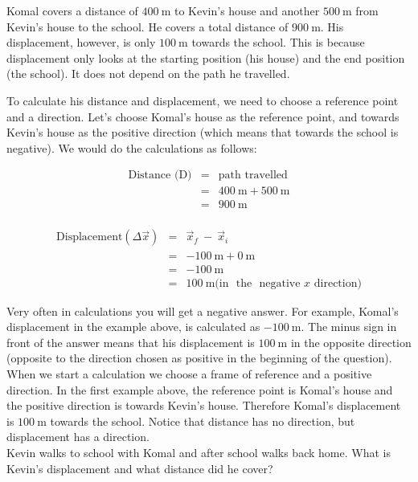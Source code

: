 Komal covers a distance of $400~\text{m}$ to Kevin's house and another $500~\text{m}$ from Kevin's house to the school. He covers a total distance of $900~\text{m}$. His displacement, however, is only $100~\text{m}$ towards the school. This is because displacement only looks at the starting position (his house) and the end position (the school). It does not depend on the path he travelled.
 
\label{m38788*id62121}To calculate his distance and displacement, we need to choose a reference point and a direction. Let's choose Komal's house as the reference point, and towards Kevin's house as the positive direction (which means that towards the school is negative). We would do the calculations as follows:\\
\begin{minipage}{0.35\textwidth}
\begin{eqnarray*}
\text{Distance (D)} &=& \text{path~travelled}\\
&=&400\ \text{m} + 500\ \text{m}\\
&=&900\ \text{m}\\
\end{eqnarray*}
\end{minipage}
\begin{minipage}{0.65\textwidth}
\begin{eqnarray*}
\text{Displacement} (\Delta \vec{x}) &=& \vec{x}_f~ - ~ \vec{x}_i\\
&=&-100\ \text{m} + 0\ \text{m}\\
&=&-100\ \text{m}\\
&=&100\ \text{m} \text{(in ~the~ negative~} x \text{~direction)}
\end{eqnarray*}
\end{minipage}
      \label{m38788*eip-883}
Very often in calculations you will get a negative answer. For example, Komal's displacement in the example above, is calculated as $-100~\text{m}$. The minus sign in front of the answer means that his displacement is $100~\text{m}$ in the opposite direction (opposite to the direction chosen as positive in the beginning of the question). When we start a calculation we choose a frame of reference and a positive direction. In the first example above, the reference point is Komal's house and the positive direction is towards Kevin's house. Therefore Komal's displacement is $100~\text{m}$ towards the school. Notice that distance has no direction, but displacement has a direction.\\
      \label{m38788*id63667}Kevin walks to school with Komal and after school walks back home. What is Kevin's displacement and what distance did he cover?
